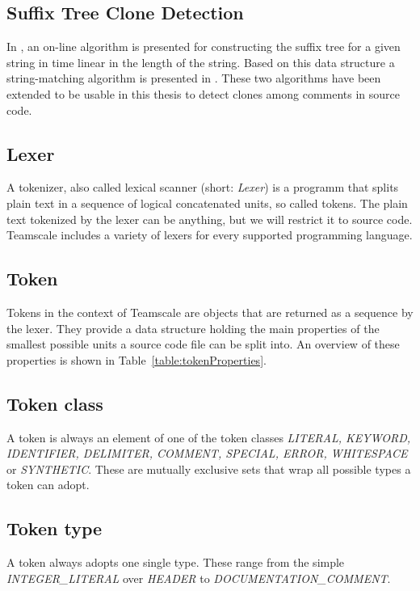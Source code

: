 \subsection{Suffix Tree Clone Detection}
In \cite{Ukkonen1995}, an on-line algorithm is presented for constructing the suffix tree for a given string in time linear in the length of the string. Based on this data structure a string-matching algorithm is presented in \cite{Ukkonen1993}. These two algorithms have been extended to be usable in this thesis to detect clones among comments in source code.

\subsection{Lexer}
A tokenizer, also called lexical scanner (short: \textit{Lexer}) is a programm that splits plain text in a sequence of logical concatenated units, so called tokens. The plain text tokenized by the lexer can be anything, but we will restrict it to source code. Teamscale includes a variety of lexers for every supported programming language. 

\subsection{Token}
\label{section:token}
Tokens in the context of Teamscale are objects that are returned as a sequence by the lexer. They provide a data structure holding the main properties of the smallest possible units a source code file can be split into. An overview of these properties is shown in Table~\ref{table:tokenProperties}.


\subsection{Token class}
A token is always an element of one of the token classes \textit{LITERAL, KEYWORD, IDENTIFIER, DELIMITER, COMMENT, SPECIAL, ERROR, WHITESPACE} or \textit{SYNTHETIC}. These are mutually exclusive sets that wrap all possible types a token can adopt.

\subsection{Token type}
A token always adopts one single type. These range from the simple \textit{INTEGER\_LITERAL} over \textit{HEADER} to \textit{DOCUMENTATION\_COMMENT}.
